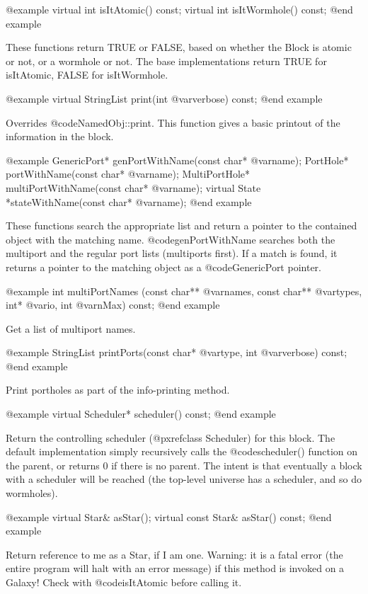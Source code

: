 @example
virtual int isItAtomic() const;
virtual int isItWormhole() const;
@end example

These functions return TRUE or FALSE, based on whether the Block is
atomic or not, or a wormhole or not.  The base implementations return
TRUE for isItAtomic, FALSE for isItWormhole.

@example
virtual StringList print(int @var{verbose}) const;
@end example

Overrides @code{NamedObj::print}.  This function gives a basic printout of
the information in the block.

@example
GenericPort* genPortWithName(const char* @var{name});
PortHole* portWithName(const char* @var{name});
MultiPortHole* multiPortWithName(const char* @var{name});
virtual State *stateWithName(const char* @var{name});
@end example

These functions search the appropriate list and return a pointer
to the contained object with the matching name.  @code{genPortWithName}
searches both the multiport and the regular port lists (multiports
first).  If a match is found, it returns a pointer to the matching
object as a @code{GenericPort} pointer.

@example
int multiPortNames (const char** @var{names}, const char** @var{types},
                    int* @var{io}, int @var{nMax}) const;
@end example

Get a list of multiport names.

@example
StringList printPorts(const char* @var{type}, int @var{verbose}) const;
@end example

Print portholes as part of the info-printing method.

@example
virtual Scheduler* scheduler() const;
@end example

Return the controlling scheduler (@pxref{class Scheduler})
for this block.  The default
implementation simply recursively calls the @code{scheduler()} function on the parent, or returns 0
if there is no parent.  The intent is that eventually a block with
a scheduler will be reached (the top-level universe has a scheduler,
and so do wormholes).

@example
virtual Star& asStar();
virtual const Star& asStar() const;
@end example

Return reference to me as a Star, if I am one.  Warning: it is a
fatal error (the entire program will halt with an error message)
if this method is invoked on a Galaxy!  Check with @code{isItAtomic}
before calling it.

